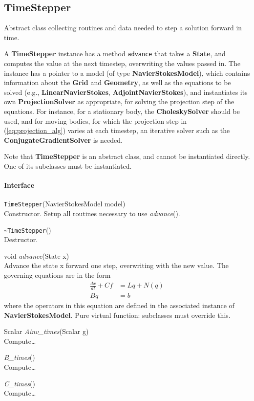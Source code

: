\documentclass[11pt]{article}
\def\class#1{{\bf #1}} %
\def\fn#1{{\tt #1}} %
\def\virtualfn#1{{\it #1}} %
\begin{document}
\subsection{TimeStepper}
Abstract class collecting routines and data needed to step a solution forward in time.

A \class{TimeStepper} instance has a method \fn{advance} that takes a \class{State}, and computes the value at the next timestep, overwriting the values passed in.  The instance has a pointer to a model (of type \class{NavierStokesModel}), which contains information about the \class{Grid} and \class{Geometry}, as well as the equations to be solved (e.g., \class{LinearNavierStokes}, \class{AdjointNavierStokes}), and instantiates its own \class{ProjectionSolver} as appropriate, for solving the projection step of the equations.  For instance, for a stationary body, the \class{CholeskySolver} should be used, and for moving bodies, for which the projection step in (\ref{eq:projection_alg}) varies at each timestep, an iterative solver such as the \class{ConjugateGradientSolver} is needed.

Note that \class{TimeStepper} is an abstract class, and cannot be instantiated directly.  One of its subclasses must be instantiated.

\paragraph{Interface}
\begin{description}
	\item \fn{TimeStepper}(NavierStokesModel model)\\
		Constructor.  Setup all routines necessary to use \virtualfn{advance}().
	\item \fn{\~\null TimeStepper}()\\
		Destructor.
	\item void \virtualfn{advance}(State x)\\
	 	Advance the state x forward one step, overwriting with the new value.  The governing equations are in the form
	\begin{align}
		\frac{dx}{dt} + Cf &= Lq + N(q)\\
		Bq &= b
	\end{align}
	where the operators in this equation are defined in the associated instance of \class{NavierStokesModel}.  Pure virtual function: subclasses must override this.
	\item Scalar \virtualfn{Ainv\_times}(Scalar g)\\
		Compute\ldots
	\item \virtualfn{B\_times}()\\
		Compute\ldots
	\item \virtualfn{C\_times}()\\
		Compute\ldots
\end{description}
\end{document}
